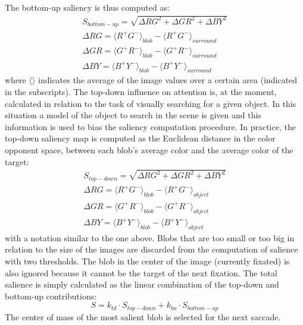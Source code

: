 \documentclass{llncs}
\begin{document}
The bottom-up saliency is thus computed as:
\begin{eqnarray}
	S_{bottom-up}=\sqrt{\Delta RG^2 + \Delta GR^2+ \Delta BY^2} \\
	\Delta RG={\langle R^+G^- \rangle}_{blob} - {\langle R^+G^- \rangle}_{surround} \\
	\Delta GR={\langle G^+R^- \rangle}_{blob} - {\langle G^+R^- \rangle}_{surround} \\
	\Delta BY={\langle B^+Y^- \rangle}_{blob} - {\langle B^+Y^- \rangle}_{surround}
	\label{eq:s_bu}
\end{eqnarray}
\noindent where $\langle \rangle$ indicates the average of the image values
over a certain area (indicated in the subscripts).
The top-down influence on attention is, at the
moment, calculated in relation to the task of visually
searching for a given object. In this situation a model of
the object to search in the scene is given and this information is used to bias the saliency
computation procedure. In practice, the top-down
saliency map is computed as the Euclidean distance in
the color opponent space, between each blob's average
color and the average color of the target:
\begin{eqnarray}
	S_{top-down}=\sqrt{\Delta RG^2 + \Delta GR^2+ \Delta BY^2} \\
	\Delta RG={\langle R^+G^- \rangle}_{blob} - {\langle R^+G^- \rangle}_{object} \\
	\Delta GR={\langle G^+R^- \rangle}_{blob} - {\langle G^+R^- \rangle}_{object} \\
	\Delta BY={\langle B^+Y^- \rangle}_{blob} - {\langle B^+Y^- \rangle}_{object}
	\label{eq:s_td}
\end{eqnarray}
\noindent with a notation similar to the one above.
Blobs that are too small or too big in relation to the
size of the images are discarded from the
computation of salience with two thresholds. The blob in
the center of the image (currently fixated) is also ignored
because it cannot be the target of the next fixation.
The total salience is simply calculated as the linear
combination of the top-down and bottom-up
contributions:
\begin{equation}
	S=k_{td} \cdot S_{top-down}+k_{bu} \cdot S_{bottom-up}
	\label{eq:s_tot}
\end{equation}
The center of mass of the most salient blob is selected for the next
saccade.

\end{document}
